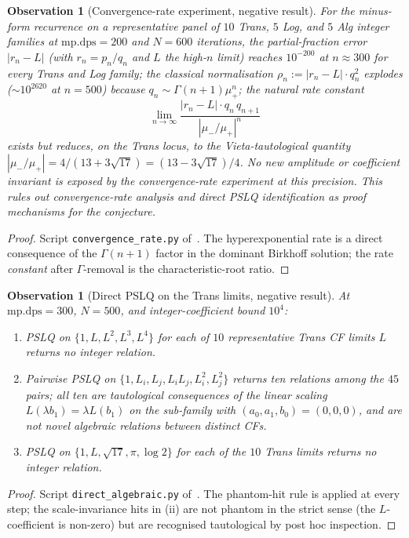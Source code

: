 \documentclass[11pt]{amsart}
\newtheorem{observation}[theorem]{Observation}
\theoremstyle{definition}
\theoremstyle{remark}
\begin{document}
\begin{observation}[Convergence-rate experiment, negative result]
\label{prop:rate}
For the minus-form recurrence on a representative panel of $10$
Trans, $5$ Log, and $5$ Alg integer families at $\mathrm{mp.dps}=200$
and $N=600$ iterations, the partial-fraction error
$|r_n - L|$ (with $r_n = p_n/q_n$ and $L$ the high-$n$ limit) reaches
$10^{-200}$ at $n\approx 300$ for every Trans and Log family;
the classical normalisation $\rho_n := |r_n-L|\cdot q_n^2$ explodes
($\sim\!10^{2620}$ at $n=500$) because $q_n \sim \Gamma(n+1)\mu_+^n$;
the natural rate constant
\[
  \lim_{n\to\infty}\frac{|r_n - L|\cdot q_n\,q_{n+1}}{|\mu_-/\mu_+|^n}
\]
exists but reduces, on the Trans locus, to the
Vieta-tautological quantity
$|\mu_-/\mu_+| = 4/(13+3\sqrt{17}) = (13-3\sqrt{17})/4$.  No new
amplitude or coefficient invariant is exposed by the convergence-rate
experiment at this precision.  This rules out convergence-rate
analysis and direct PSLQ identification as proof mechanisms for the
conjecture.
\end{observation}
\begin{proof}
Script \texttt{convergence\_rate.py} of~\cite{SprintW3Report}.
The hyperexponential rate is a direct consequence of the
$\Gamma(n+1)$ factor in the dominant Birkhoff solution; the rate
\emph{constant} after $\Gamma$-removal is the characteristic-root ratio.
\end{proof}

\begin{observation}[Direct PSLQ on the Trans limits, negative result]
\label{prop:pslq-direct}
At $\mathrm{mp.dps} = 300$, $N=500$, and integer-coefficient bound
$10^4$:
\begin{enumerate}[label={\upshape(\roman*)}]
\item PSLQ on $\{1,L,L^2,L^3,L^4\}$ for each of $10$ representative
Trans CF limits $L$ returns no integer relation.
\item Pairwise PSLQ on $\{1,L_i,L_j,L_iL_j,L_i^2,L_j^2\}$ returns ten
relations among the $45$ pairs; all ten are tautological consequences
of the linear scaling $L(\lambda b_1) = \lambda L(b_1)$ on the
sub-family with $(a_0,a_1,b_0) = (0,0,0)$, and are not novel
algebraic relations between distinct CFs.
\item PSLQ on $\{1,L,\sqrt{17},\pi,\log 2\}$ for each of the $10$
Trans limits returns no integer relation.
\end{enumerate}
\end{observation}
\begin{proof}
Script \texttt{direct\_algebraic.py} of~\cite{SprintW3Report}.
The phantom-hit rule is applied at every step; the scale-invariance
hits in (ii) are not phantom in the strict sense (the
$L$-coefficient is non-zero) but are recognised tautological by post
hoc inspection.
\end{proof}
\end{document}
